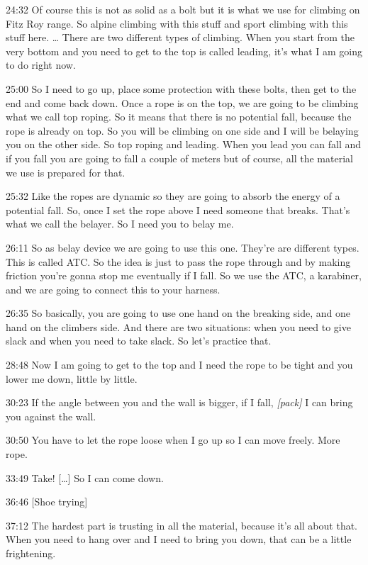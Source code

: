 24:32 Of course this is not as solid as a bolt but it is what we use for
climbing on Fitz Roy range. So alpine climbing with this stuff and sport
climbing with this stuff here. \ldots{} There are two different types of
climbing. When you start from the very bottom and you need to get to the
top is called leading, it's what I am going to do right now.

25:00 So I need to go up, place some protection with these bolts, then
get to the end and come back down. Once a rope is on the top, we are
going to be climbing what we call top roping. So it means that there is
no potential fall, because the rope is already on top. So you will be
climbing on one side and I will be belaying you on the other side. So
top roping and leading. When you lead you can fall and if you fall you
are going to fall a couple of meters but of course, all the material we
use is prepared for that.

25:32 Like the ropes are dynamic so they are going to absorb the energy
of a potential fall. So, once I set the rope above I need someone that
breaks. That's what we call the belayer. So I need you to belay me.

26:11 So as belay device we are going to use this one. They're are
different types. This is called ATC. So the idea is just to pass the
rope through and by making friction you're gonna stop me eventually if I
fall. So we use the ATC, a karabiner, and we are going to connect this
to your harness.

26:35 So basically, you are going to use one hand on the breaking side,
and one hand on the climbers side. And there are two situations: when
you need to give slack and when you need to take slack. So let's
practice that.

28:48 Now I am going to get to the top and I need the rope to be tight
and you lower me down, little by little.

30:23 If the angle between you and the wall is bigger, if I fall,
\emph{{[}pack{]}} I can bring you against the wall.

30:50 You have to let the rope loose when I go up so I can move freely.
More rope.

33:49 Take! {[}\ldots{}{]} So I can come down.

36:46 {[}Shoe trying{]}

37:12 The hardest part is trusting in all the material, because it's all
about that. When you need to hang over and I need to bring you down,
that can be a little frightening.

